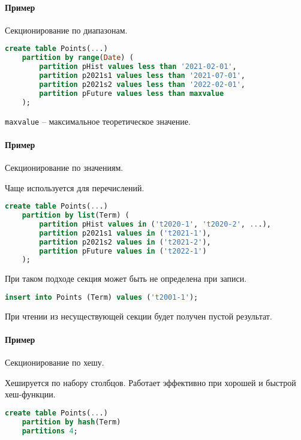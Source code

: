 \paragraph{Пример} Секционирование по диапазонам.

\begin{lstlisting}[language=SQL]
    create table Points(...)
    partition by range(Date) (
        partition pHist values less than '2021-02-01',
        partition p2021s1 values less than '2021-07-01',
        partition p2021s2 values less than '2022-02-01',
        partition pFuture values less than maxvalue
    );
\end{lstlisting}

\texttt{maxvalue} -- максимальное теоретическое значение.

\paragraph{Пример} Секционирование по значениям.

Чаще используется для перечислений.

\begin{lstlisting}[language=SQL]
    create table Points(...)
    partition by list(Term) (
        partition pHist values in ('t2020-1', 't2020-2', ...),
        partition p2021s1 values in ('t2021-1'),
        partition p2021s2 values in ('t2021-2'),
        partition pFuture values in ('t2022-1')
    );
\end{lstlisting}

При таком подходе секция может быть не определена при записи.

\begin{lstlisting}[language=SQL]
    insert into Points (Term) values ('t2001-1');
\end{lstlisting}

При чтении из несуществующей секции будет получен пустой результат.

\paragraph{Пример} Секционирование по хешу.

Хешируется по набору столбцов. Работает эффективно при хорошей и быстрой хеш-функции.

\begin{lstlisting}[language=SQL]
    create table Points(...)
    partition by hash(Term)
    partitions 4;
\end{lstlisting}

